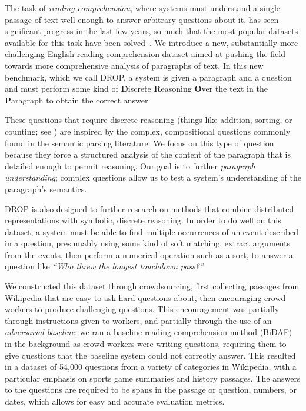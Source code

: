 The task of \emph{reading comprehension}, where systems must understand a single passage of text well enough to answer arbitrary questions about it, has seen significant progress in the last few years, so much that the most popular datasets available for this task have been solved~\citep{Chen2016ATE,Devlin2018BERTPO}.  We introduce a new, substantially more challenging English reading comprehension dataset aimed at pushing the field towards more comprehensive analysis of paragraphs of text.  In this new benchmark, which we call DROP, a system is given a paragraph and a question and must perform some kind of {\bf D}iscrete {\bf R}easoning {\bf O}ver the text in the {\bf P}aragraph to obtain the correct answer.

These questions that require discrete reasoning (things like addition, sorting, or counting; see ) are inspired by the complex, compositional questions commonly found in the semantic parsing literature.  We focus on this type of question because they force a structured analysis of the content of the paragraph that is detailed enough to permit reasoning.  Our goal is to further \emph{paragraph understanding}; complex questions allow us to test a system's understanding of the paragraph's semantics.

DROP is also designed to further research on methods that combine distributed representations with symbolic, discrete reasoning.  In order to do well on this dataset, a system must be able to find multiple occurrences of an event described in a question, presumably using some kind of soft matching, extract arguments from the events, then perform a numerical operation such as a sort, to answer a question like \textit{``Who threw the longest touchdown pass?''}

We constructed this dataset through crowdsourcing, first collecting passages from Wikipedia that are easy to ask hard questions about, then encouraging crowd workers to produce challenging questions.  This encouragement was partially through instructions given to workers, and partially through the use of an \emph{adversarial baseline}: we ran a baseline reading comprehension method (BiDAF)~\citep{Seo2016BidirectionalAF} in the background as crowd workers were writing questions, requiring them to give questions that the baseline system could not correctly answer.  This resulted in a dataset of 54,000 questions from a variety of categories in Wikipedia, with a particular emphasis on sports game summaries and history passages.  The answers to the questions are required to be spans in the passage or question, numbers, or dates, which allows for easy and accurate evaluation metrics.

